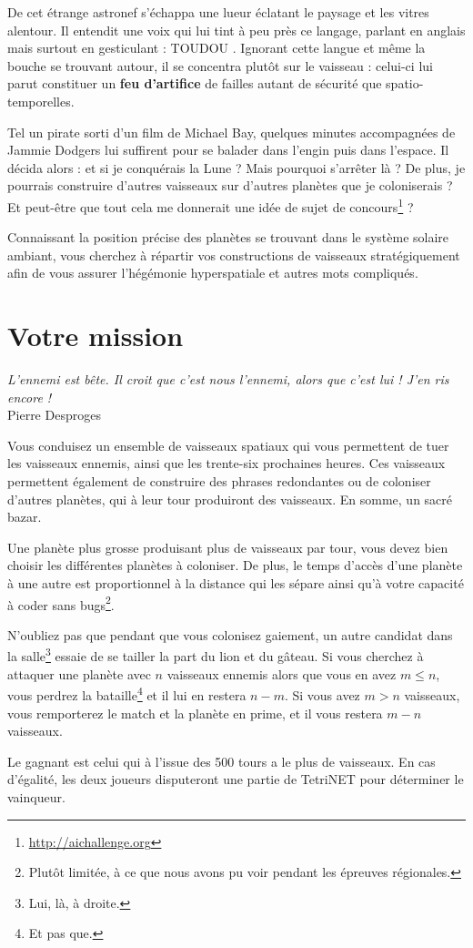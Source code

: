 De cet étrange astronef s'échappa une lueur éclatant le paysage et les vitres alentour. Il entendit une voix qui lui tint à peu près ce langage, parlant en anglais mais surtout en gesticulant : \og TOUDOU \fg. Ignorant cette langue et même la bouche se trouvant autour, il se concentra plutôt sur le vaisseau : celui-ci lui parut constituer un \textbf{feu d'artifice} de failles autant de sécurité que spatio-temporelles.

Tel un pirate sorti d'un film de Michael Bay, quelques minutes accompagnées de Jammie Dodgers lui suffirent pour se balader dans l'engin puis dans l'espace. Il décida alors : et si je conquérais la Lune ? Mais pourquoi s'arrêter là ? De plus, je pourrais construire d'autres vaisseaux sur d'autres planètes que je coloniserais ? Et peut-être que tout cela me donnerait une idée de sujet de concours\footnote{\url{http://aichallenge.org}} ?

Connaissant la position précise des planètes se trouvant dans le système solaire ambiant, vous cherchez à répartir vos constructions de vaisseaux stratégiquement afin de vous assurer l'hégémonie hyperspatiale et autres mots compliqués.

\newpage

\section{Votre mission}

{\selectfont \textit{L'ennemi est bête. Il croit que c'est nous l'ennemi, alors que c'est lui ! J'en ris encore !}}\\
\hbox{}\hfill {\small Pierre Desproges}

Vous conduisez un ensemble de vaisseaux spatiaux qui vous permettent de tuer les vaisseaux ennemis, ainsi que les trente-six prochaines heures. Ces vaisseaux permettent également de construire des phrases redondantes ou de coloniser d'autres planètes, qui à leur tour produiront des vaisseaux. En somme, un sacré bazar.

Une planète plus grosse produisant plus de vaisseaux par tour, vous devez bien choisir les différentes planètes à coloniser. De plus, le temps d'accès d'une planète à une autre est proportionnel à la distance qui les sépare ainsi qu'à votre capacité à coder sans bugs\footnote{Plutôt limitée, à ce que nous avons pu voir pendant les épreuves régionales.}.

N'oubliez pas que pendant que vous colonisez gaiement, un autre candidat dans la salle\footnote{Lui, là, à droite.} essaie de se tailler la part du lion et du gâteau. Si vous cherchez à attaquer une planète avec $n$ vaisseaux ennemis alors que vous en avez $m \leqslant n$, vous perdrez la bataille\footnote{Et pas que.} et il lui en restera $n - m$. Si vous avez $m > n$ vaisseaux, vous remporterez le match et la planète en prime, et il vous restera $m - n$ vaisseaux.

Le gagnant est celui qui à l'issue des 500 tours a le plus de vaisseaux. En cas d'égalité, les deux joueurs disputeront une partie de TetriNET pour déterminer le vainqueur.
